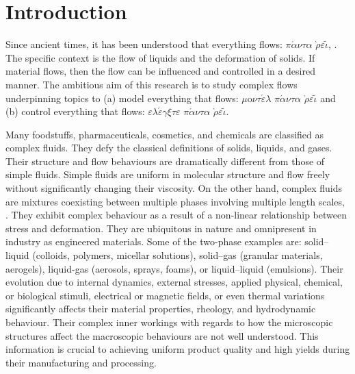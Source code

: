 \documentclass[oneside,11pt,a4paper]{article}
\begin{document}
\section{Introduction}
Since ancient times, it has been understood that everything flows: $\pi\acute{\alpha}\nu\tau\alpha$ $\grave{\rho}\varepsilon\tilde{\iota}$, \cite{beris2014}. The specific context is the flow of liquids and the deformation of solids. If material flows, then the flow can be influenced and controlled in a desired manner. The ambitious aim of this research is to study complex flows underpinning topics to (a) model everything that flows: $\mu$o$\nu\tau\acute{\varepsilon}\lambda$ $\pi\acute{\alpha}\nu\tau\alpha$ $\grave{\rho}\varepsilon\tilde{\iota}$ and (b) control everything that flows: $\varepsilon\lambda\acute{\varepsilon}\gamma\xi\tau\varepsilon$  $\pi\acute{\alpha}\nu\tau\alpha$ $\grave{\rho}\varepsilon\tilde{\iota}$.


Many foodstuffs, pharmaceuticals, cosmetics, and chemicals are classified as complex fluids. They defy the classical definitions of solids, liquids, and gases. Their structure and flow behaviours are dramatically different from those of simple fluids. Simple fluids are uniform in molecular structure and flow freely without significantly changing their viscosity. On the other hand, complex fluids are mixtures coexisting between multiple phases involving multiple length scales, \cite{larson1999structure}. They exhibit complex behaviour as a result of a non-linear relationship between stress and deformation. They are ubiquitous in nature and omnipresent in industry as engineered materials. Some of the two-phase examples are: solid--liquid (colloids, polymers, micellar solutions), solid--gas (granular materials, aerogels), liquid-gas (aerosols, sprays, foams), or liquid--liquid (emulsions). Their evolution due to internal dynamics, external stresses, applied physical, chemical, or biological stimuli, electrical or magnetic fields, or even thermal variations significantly affects their material properties, rheology, and hydrodynamic behaviour. Their complex inner workings with regards to how the microscopic structures affect the macroscopic behaviours are not well understood. This information is crucial to achieving uniform product quality and high yields during their manufacturing and processing.
\end{document}
